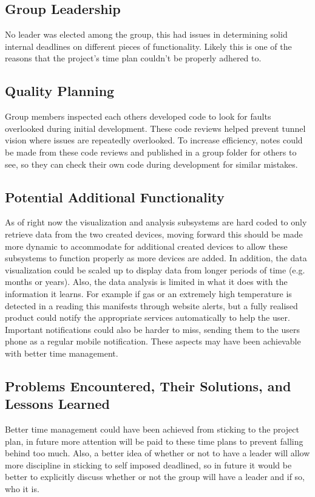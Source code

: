 \documentclass[]{report}
\begin{document}
	\subsection{Group Leadership}
	No leader was elected among the group, this had issues in determining solid internal deadlines on different pieces of functionality. Likely this is one of the reasons that the project's time plan couldn't be properly adhered to.
	
	\subsection{Quality Planning}
	Group members inspected each others developed code to look for faults overlooked during initial development. These code reviews helped prevent tunnel vision where issues are repeatedly overlooked. To increase efficiency, notes could be made from these code reviews and published in a group folder for others to see, so they can check their own code during development for similar mistakes.
	
	\subsection{Potential Additional Functionality}
	As of right now the visualization and analysis subsystems are hard coded to only retrieve data from the two created devices, moving forward this should be made more dynamic to accommodate for additional created devices to allow these subsystems to function properly as more devices are added. In addition, the data visualization could be scaled up to display data from longer periods of time (e.g. months or years). Also, the data analysis is limited in what it does with the information it learns. For example if gas or an extremely high temperature is detected in a reading this manifests through website alerts, but a fully realised product could notify the appropriate services automatically to help the user. Important notifications could also be harder to miss, sending them to the users phone as a regular mobile notification. These aspects may have been achievable with better time management.
	
	\subsection{Problems Encountered, Their Solutions, and Lessons Learned}
	Better time management could have been achieved from sticking to the project plan, in future more attention will be paid to these time plans to prevent falling behind too much. Also, a better idea of whether or not to have a leader will allow more discipline in sticking to self imposed deadlined, so in future it would be better to explicitly discuss whether or not the group will have a leader and if so, who it is.
\end{document}

